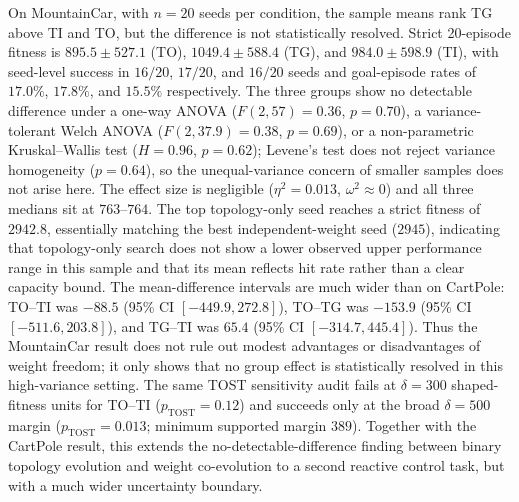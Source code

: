 \documentclass[10pt]{article}
\begin{document}
On MountainCar, with $n=20$ seeds per condition, the sample means rank TG above
TI and TO, but the difference is not statistically resolved. Strict
20-episode fitness is $895.5\pm527.1$ (TO),
$1049.4\pm588.4$ (TG), and $984.0\pm598.9$ (TI), with seed-level success in
$16/20$, $17/20$, and $16/20$ seeds and goal-episode rates of $17.0\%$, $17.8\%$,
and $15.5\%$ respectively. The three groups show no detectable difference under a
one-way ANOVA ($F(2,57)=0.36$, $p=0.70$), a variance-tolerant Welch ANOVA
($F(2,37.9)=0.38$, $p=0.69$), or a non-parametric Kruskal--Wallis test
($H=0.96$, $p=0.62$); Levene's test does not reject variance homogeneity
($p=0.64$), so the unequal-variance concern of smaller samples does not arise
here. The effect size is negligible ($\eta^2=0.013$, $\omega^2\approx0$) and all
three medians sit at $763$--$764$. The top topology-only seed reaches a strict
fitness of $2942.8$, essentially matching the best independent-weight seed
($2945$), indicating that topology-only search does not show a lower observed
upper performance range in this sample and that its mean reflects hit rate rather
than a clear capacity bound. The mean-difference intervals are much wider than
on CartPole: TO--TI was $-88.5$ (95\% CI $[-449.9,272.8]$), TO--TG was
$-153.9$ (95\% CI $[-511.6,203.8]$), and TG--TI was $65.4$ (95\% CI
$[-314.7,445.4]$). Thus the MountainCar result does not rule out modest
advantages or disadvantages of weight freedom; it only shows that no group
effect is statistically resolved in this high-variance setting. The same TOST
sensitivity audit fails at $\delta=300$ shaped-fitness units for TO--TI
($p_\mathrm{TOST}=0.12$) and succeeds only at the broad $\delta=500$ margin
($p_\mathrm{TOST}=0.013$; minimum supported margin $389$). Together with the
CartPole result, this extends the no-detectable-difference finding between
binary topology evolution and weight co-evolution to a second reactive control
task, but with a much wider uncertainty boundary.
\end{document}
